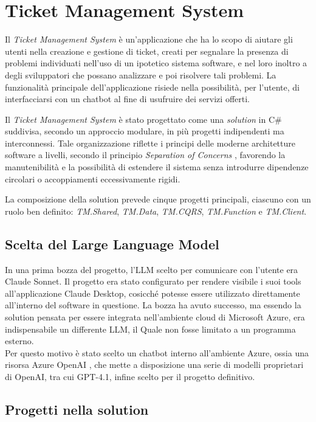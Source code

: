 \chapter{Ticket Management System}

Il \textit{Ticket Management System} è un'applicazione che ha lo scopo di aiutare gli utenti nella creazione e gestione di ticket,
creati per segnalare la presenza di problemi individuati nell'uso di un ipotetico sistema software, e nel loro inoltro a degli sviluppatori
che possano analizzare e poi risolvere tali problemi. La funzionalità principale dell'applicazione risiede nella possibilità, per l'utente, 
di interfacciarsi con un chatbot al fine di usufruire dei servizi offerti.

Il \textit{Ticket Management System} è stato progettato come una \textit{solution} in C\# suddivisa, secondo un approccio modulare,
in più progetti indipendenti ma interconnessi. Tale organizzazione riflette i principi delle moderne architetture software a livelli,
secondo il principio \textit{Separation of Concerns} \cite{msdn2009separation}, favorendo la manutenibilità e la possibilità di estendere il sistema
senza introdurre dipendenze circolari o accoppiamenti eccessivamente rigidi.

La composizione della solution prevede cinque progetti principali, ciascuno con un ruolo ben definito: \textit{TM.Shared}, \textit{TM.Data},
\textit{TM.CQRS}, \textit{TM.Function} e \textit{TM.Client}.

\newpage
\section{Scelta del Large Language Model}
In una prima bozza del progetto, l'LLM scelto per comunicare con l'utente era Claude Sonnet. Il progetto era stato configurato per rendere visibile i suoi
tools all'applicazione Claude Desktop, cosicché potesse essere utilizzato direttamente all'interno del software in questione. La bozza ha avuto successo, ma
essendo la solution pensata per essere integrata nell'ambiente cloud di Microsoft Azure, era indispensabile un differente LLM, il Quale non fosse
limitato a un programma esterno. \\
Per questo motivo è stato scelto un chatbot interno all'ambiente Azure, ossia una risorsa Azure OpenAI \cite{azure_openai_foundry}, che mette a disposizione
una serie di modelli proprietari di OpenAI, tra cui GPT-4.1, infine scelto per il progetto definitivo.

\newpage
\section{Progetti nella solution}

